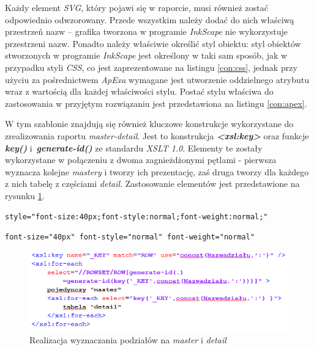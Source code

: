 \documentclass[11pt,a4paper]{article}
\begin{document}
Każdy element \emph{SVG}, który pojawi się w raporcie, musi również zostać odpowiednio odwzorowany. Przede wszystkim należy dodać do nich właściwą przestrzeń nazw -- grafika tworzona w programie \emph{InkScape} nie wykorzystuje przestrzeni nazw. Ponadto należy właściwie określić styl obiektu: styl obiektów stworzonych w programie \emph{InkScape} jest określony w taki sam sposób, jak w przypadku styli \emph{CSS}, co jest zaprezentowane na listingu \ref{con:css}, jednak przy użyciu za pośrednictwem \emph{ApExa} wymagane jest utworzenie oddzielnego atrybutu wraz z wartością dla każdej właściwości stylu. Postać stylu właściwa do zastosowania w przyjętym rozwiązaniu jest przedstawiona na listingu \ref{con:apex}.

W tym szablonie znajdują się również kluczowe konstrukcje wykorzystane do zrealizowania raportu \emph{master-detail}. Jest to konstrukcja \emph{\textbf{\textless xsl:key\textgreater}} oraz funkcje \emph{\textbf{key()}} i~\emph{\textbf{generate-id()}} ze standardu \emph{XSLT 1.0}. Elementy te zostały wykorzystane w połączeniu z dwoma zagnieżdżonymi pętlami - pierwsza wyznacza kolejne \emph{mastery} i tworzy ich prezentację, zaś druga tworzy dla każdego z nich tabelę z częściami \emph{detail}. Zastosowanie elementów jest przedstawione na rysunku \ref{img:grouping}.

\lstset{}
\begin{lstlisting}[frame=single,caption=Przykład stylu obiektu utworzonego w programie \emph{InkScape}, label=con:css]
style="font-size:40px;font-style:normal;font-weight:normal;"
\end{lstlisting}

\lstset{}
\begin{lstlisting}[frame=single,caption=Przykład wymaganej postaci stylu obiektu, label=con:apex]
font-size="40px" font-style="normal" font-weight="normal"
\end{lstlisting}

\begin{figure}[h]
\centering
\includegraphics[scale=0.8]{grouping}
\caption{Realizacja wyznaczania podziałów na \emph{master}  i \emph{detail}}
\label{img:grouping}
\end{figure}
\end{document}
